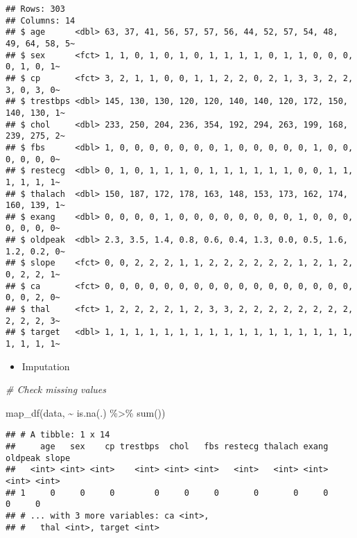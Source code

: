 \documentclass[
]{book}
\newenvironment{Shaded}{\begin{snugshade}}{\end{snugshade}}
\newcommand{\CommentTok}[1]{\textcolor[rgb]{0.56,0.35,0.01}{\textit{#1}}}
\newcommand{\FunctionTok}[1]{\textcolor[rgb]{0.00,0.00,0.00}{#1}}
\newcommand{\NormalTok}[1]{#1}
\newcommand{\SpecialCharTok}[1]{\textcolor[rgb]{0.00,0.00,0.00}{#1}}
\providecommand{\tightlist}{%
  \setlength{\itemsep}{0pt}\setlength{\parskip}{0pt}}
\begin{document}
\begin{verbatim}
## Rows: 303
## Columns: 14
## $ age      <dbl> 63, 37, 41, 56, 57, 57, 56, 44, 52, 57, 54, 48, 49, 64, 58, 5~
## $ sex      <fct> 1, 1, 0, 1, 0, 1, 0, 1, 1, 1, 1, 0, 1, 1, 0, 0, 0, 0, 1, 0, 1~
## $ cp       <fct> 3, 2, 1, 1, 0, 0, 1, 1, 2, 2, 0, 2, 1, 3, 3, 2, 2, 3, 0, 3, 0~
## $ trestbps <dbl> 145, 130, 130, 120, 120, 140, 140, 120, 172, 150, 140, 130, 1~
## $ chol     <dbl> 233, 250, 204, 236, 354, 192, 294, 263, 199, 168, 239, 275, 2~
## $ fbs      <dbl> 1, 0, 0, 0, 0, 0, 0, 0, 1, 0, 0, 0, 0, 0, 1, 0, 0, 0, 0, 0, 0~
## $ restecg  <dbl> 0, 1, 0, 1, 1, 1, 0, 1, 1, 1, 1, 1, 1, 0, 0, 1, 1, 1, 1, 1, 1~
## $ thalach  <dbl> 150, 187, 172, 178, 163, 148, 153, 173, 162, 174, 160, 139, 1~
## $ exang    <dbl> 0, 0, 0, 0, 1, 0, 0, 0, 0, 0, 0, 0, 0, 1, 0, 0, 0, 0, 0, 0, 0~
## $ oldpeak  <dbl> 2.3, 3.5, 1.4, 0.8, 0.6, 0.4, 1.3, 0.0, 0.5, 1.6, 1.2, 0.2, 0~
## $ slope    <fct> 0, 0, 2, 2, 2, 1, 1, 2, 2, 2, 2, 2, 2, 1, 2, 1, 2, 0, 2, 2, 1~
## $ ca       <fct> 0, 0, 0, 0, 0, 0, 0, 0, 0, 0, 0, 0, 0, 0, 0, 0, 0, 0, 0, 2, 0~
## $ thal     <fct> 1, 2, 2, 2, 2, 1, 2, 3, 3, 2, 2, 2, 2, 2, 2, 2, 2, 2, 2, 2, 3~
## $ target   <dbl> 1, 1, 1, 1, 1, 1, 1, 1, 1, 1, 1, 1, 1, 1, 1, 1, 1, 1, 1, 1, 1~
\end{verbatim}

\begin{itemize}
\tightlist
\item
  Imputation
\end{itemize}

\begin{Shaded}
\begin{Highlighting}[]
\CommentTok{\# Check missing values }

\FunctionTok{map\_df}\NormalTok{(data, }\SpecialCharTok{\textasciitilde{}} \FunctionTok{is.na}\NormalTok{(.) }\SpecialCharTok{\%\textgreater{}\%} \FunctionTok{sum}\NormalTok{())}
\end{Highlighting}
\end{Shaded}

\begin{verbatim}
## # A tibble: 1 x 14
##     age   sex    cp trestbps  chol   fbs restecg thalach exang oldpeak slope
##   <int> <int> <int>    <int> <int> <int>   <int>   <int> <int>   <int> <int>
## 1     0     0     0        0     0     0       0       0     0       0     0
## # ... with 3 more variables: ca <int>,
## #   thal <int>, target <int>
\end{verbatim}
\end{document}
